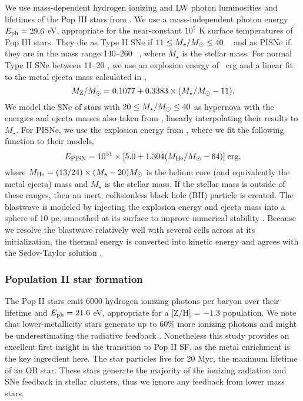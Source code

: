 \documentclass[12pt,preprint]{aastex}
\begin{document}
We use mass-dependent hydrogen ionizing and LW photon luminosities and
lifetimes of the Pop III stars from \citet{Schaerer02}.  We use a
mass-independent photon energy $E_{\rm ph} = 29.6$ eV, appropriate for
the near-constant $10^5$ K surface temperatures of Pop III stars.
They die as Type II SNe if $11 \le M_\star/\Ms \le 40$
\Ms~\citep{Woosley95} and as PISNe if they are in the mass range
140--260 \Ms~\citep{Heger03}, where $M_\star$ is the stellar mass.
For normal Type II SNe between 11--20 \Ms, we use an explosion energy
of ~erg and a linear fit to the metal ejecta mass calculated
in \citet{Nomoto06},
%
\begin{equation}
  \label{eqn:typeii}
  M_{\rm Z}/\Ms = 0.1077 + 0.3383 \times (M_\star/\Ms - 11).
\end{equation}
%
We model the SNe of stars with $20 \le M_\star/\Ms \le 40$ as
hypernova with the energies and ejecta masses also taken from
\citeauthor{Nomoto06}, linearly interpolating their results to
$M_\star$.  For PISNe, we use the explosion energy from
\citet{Heger02}, where we fit the following function to their models,
%
\begin{equation}
  \label{eqn:pisn}
  E_{\rm PISN} = 10^{51} \times [5.0 + 1.304 (M_{\rm He}/\Ms - 64)] \;
  \mathrm{erg},
\end{equation}
%
where $M_{\rm He} = (13/24) \times (M_\star - 20) \Ms$ is the helium
core (and equivalently the metal ejecta) mass and $M_\star$ is the
stellar mass.  If the stellar mass is outside of these ranges, then an
inert, collisionless black hole (BH) particle is created.  The
blastwave is modeled by injecting the explosion energy and ejecta mass
into a sphere of 10 pc, smoothed at its surface to improve numerical
stability \citep{Wise08_Gal}.  Because we resolve the blastwave
relatively well with several cells across at its initialization, the
thermal energy is converted into kinetic energy and agrees with the
Sedov-Taylor solution \citep[e.g.][]{Greif07}.

\subsubsection{Population II star formation}

The Pop II stars emit 6000 hydrogen ionizing photons per baryon over
their lifetime and $E_{\rm ph} = 21.6$ eV, appropriate for a [Z/H] =
$-1.3$ population.  We note that lower-metallicity stars generate up
to 60\% more ionizing photons and might be underestimating the
radiative feedback \citep{Schaerer03}.  Nonetheless this study
provides an excellent first insight in the transition to Pop II SF, as
the metal enrichment is the key ingredient here.  The star particles
live for 20 Myr, the maximum lifetime of an OB star.  These stars
generate the majority of the ionizing radiation and SNe feedback in
stellar clusters, thus we ignore any feedback from lower mass stars.
\end{document}
